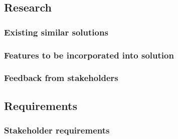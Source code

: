 \documentclass[11pt,a4paper]{article}
\begin{document}
\begin{comment}
half a page of key things that were found out from the interviews
should include / should not include / etc.


\end{comment}

\pagebreak

\subsection{Research}


\subsubsection{Existing similar solutions}


\pagebreak

\subsubsection{Features to be incorporated into solution}


\begin{comment}

\subsubsection{Limitations of the solution}
limitations:

- time

- limited by any software

- money - hosting backend?
- not getting an apple dev account
so won't be a "true" mobile app, more of a website on the home screen.
\end{comment}

\subsubsection{Feedback from stakeholders}

\subsection{Requirements}

\subsubsection{Stakeholder requirements}
\label{sec:stakeholderRequirements}

\end{document}
